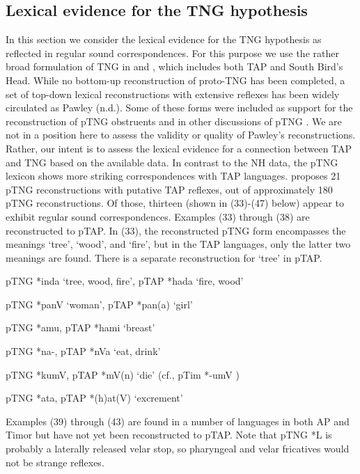 \subsection{Lexical evidence for the TNG hypothesis}
In this section we consider the lexical evidence for the TNG hypothesis as reflected in regular sound correspondences. For this purpose we use the rather broad formulation of TNG in \citet{Pawley2005} and \citet{Ross2005}, which includes both TAP and South Bird's Head. While no bottom-up reconstruction of proto-TNG has been completed, a set of top-down lexical reconstructions with extensive reflexes has been widely circulated as Pawley (n.d.). Some of these forms were included as support for the reconstruction of pTNG obstruents \citep{Pawley2001} and in other discussions of pTNG \citep{Pawley1998,Pawley2012}. We are not in a position here to assess the validity or quality of Pawley's reconstructions. Rather, our intent is to assess the lexical evidence for a connection between TAP and TNG based on the available data. In contrast to the NH data, the pTNG lexicon shows more striking correspondences with TAP languages. \citet{Pawleynd} proposes 21 pTNG reconstructions with putative TAP reflexes, out of approximately
180 pTNG reconstructions. Of those, thirteen (shown in (33)-(47) below) appear to exhibit regular sound correspondences. Examples (33) through (38) are reconstructed to pTAP. In (33), the reconstructed pTNG form encompasses the meanings `tree', `wood', and `fire', but in the TAP languages, only the latter two meanings are found. There is a separate reconstruction for `tree' in pTAP.

\ea%
   pTNG *inda `tree, wood, fire', pTAP *hada `fire, wood'  
\z

\ea%
   pTNG *panV `woman', pTAP *pan(a) `girl'  
\z

\ea%
   pTNG *amu, pTAP *hami `breast'  
\z

\ea%
   pTNG *na-, pTAP *nVa `eat, drink'  
\z

\ea%
   pTNG *kumV, pTAP *mV(n) `die' (cf., pTim *-umV )  
\z

\ea%
   pTNG *ata, pTAP *(h)at(V) `excrement'  
\z

Examples (39) through (43) are found in a number of languages in both AP and Timor but have not yet been reconstructed to pTAP. Note that pTNG *L is probably a laterally released velar stop, so pharyngeal and velar fricatives would not be strange reflexes.

